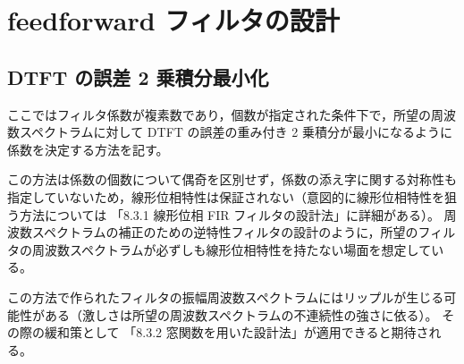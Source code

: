 \section{feedforward フィルタの設計}
    \subsection{DTFT の誤差 2 乗積分最小化}
        \newcommand*{\Hideal}{H_\text{ideal}}
        \newcommand*{\vhOpt}{\bm{h}_\text{opt}}
        ここではフィルタ係数が複素数であり，個数が指定された条件下で，所望の周波数スペクトラムに対して DTFT の誤差の重み付き 2 乗積分が最小になるように係数を決定する方法を記す。
        \par
        この方法は係数の個数について偶奇を区別せず，係数の添え字に関する対称性も指定していないため，線形位相特性は保証されない（意図的に線形位相特性を狙う方法については \cite{learn_sp_from_basic} 「8.3.1 線形位相 FIR フィルタの設計法」に詳細がある）。
        周波数スペクトラムの補正のための逆特性フィルタの設計のように，所望のフィルタの周波数スペクトラムが必ずしも線形位相特性を持たない場面を想定している。
        \par
        この方法で作られたフィルタの振幅周波数スペクトラムにはリップルが生じる可能性がある（激しさは所望の周波数スペクトラムの不連続性の強さに依る）。
        その際の緩和策として \cite{learn_sp_from_basic} 「8.3.2 窓関数を用いた設計法」が適用できると期待される。
